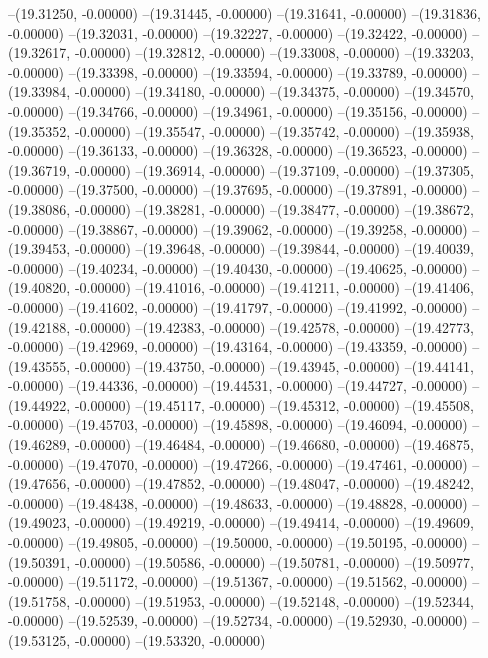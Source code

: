 --(19.31250, -0.00000)
--(19.31445, -0.00000)
--(19.31641, -0.00000)
--(19.31836, -0.00000)
--(19.32031, -0.00000)
--(19.32227, -0.00000)
--(19.32422, -0.00000)
--(19.32617, -0.00000)
--(19.32812, -0.00000)
--(19.33008, -0.00000)
--(19.33203, -0.00000)
--(19.33398, -0.00000)
--(19.33594, -0.00000)
--(19.33789, -0.00000)
--(19.33984, -0.00000)
--(19.34180, -0.00000)
--(19.34375, -0.00000)
--(19.34570, -0.00000)
--(19.34766, -0.00000)
--(19.34961, -0.00000)
--(19.35156, -0.00000)
--(19.35352, -0.00000)
--(19.35547, -0.00000)
--(19.35742, -0.00000)
--(19.35938, -0.00000)
--(19.36133, -0.00000)
--(19.36328, -0.00000)
--(19.36523, -0.00000)
--(19.36719, -0.00000)
--(19.36914, -0.00000)
--(19.37109, -0.00000)
--(19.37305, -0.00000)
--(19.37500, -0.00000)
--(19.37695, -0.00000)
--(19.37891, -0.00000)
--(19.38086, -0.00000)
--(19.38281, -0.00000)
--(19.38477, -0.00000)
--(19.38672, -0.00000)
--(19.38867, -0.00000)
--(19.39062, -0.00000)
--(19.39258, -0.00000)
--(19.39453, -0.00000)
--(19.39648, -0.00000)
--(19.39844, -0.00000)
--(19.40039, -0.00000)
--(19.40234, -0.00000)
--(19.40430, -0.00000)
--(19.40625, -0.00000)
--(19.40820, -0.00000)
--(19.41016, -0.00000)
--(19.41211, -0.00000)
--(19.41406, -0.00000)
--(19.41602, -0.00000)
--(19.41797, -0.00000)
--(19.41992, -0.00000)
--(19.42188, -0.00000)
--(19.42383, -0.00000)
--(19.42578, -0.00000)
--(19.42773, -0.00000)
--(19.42969, -0.00000)
--(19.43164, -0.00000)
--(19.43359, -0.00000)
--(19.43555, -0.00000)
--(19.43750, -0.00000)
--(19.43945, -0.00000)
--(19.44141, -0.00000)
--(19.44336, -0.00000)
--(19.44531, -0.00000)
--(19.44727, -0.00000)
--(19.44922, -0.00000)
--(19.45117, -0.00000)
--(19.45312, -0.00000)
--(19.45508, -0.00000)
--(19.45703, -0.00000)
--(19.45898, -0.00000)
--(19.46094, -0.00000)
--(19.46289, -0.00000)
--(19.46484, -0.00000)
--(19.46680, -0.00000)
--(19.46875, -0.00000)
--(19.47070, -0.00000)
--(19.47266, -0.00000)
--(19.47461, -0.00000)
--(19.47656, -0.00000)
--(19.47852, -0.00000)
--(19.48047, -0.00000)
--(19.48242, -0.00000)
--(19.48438, -0.00000)
--(19.48633, -0.00000)
--(19.48828, -0.00000)
--(19.49023, -0.00000)
--(19.49219, -0.00000)
--(19.49414, -0.00000)
--(19.49609, -0.00000)
--(19.49805, -0.00000)
--(19.50000, -0.00000)
--(19.50195, -0.00000)
--(19.50391, -0.00000)
--(19.50586, -0.00000)
--(19.50781, -0.00000)
--(19.50977, -0.00000)
--(19.51172, -0.00000)
--(19.51367, -0.00000)
--(19.51562, -0.00000)
--(19.51758, -0.00000)
--(19.51953, -0.00000)
--(19.52148, -0.00000)
--(19.52344, -0.00000)
--(19.52539, -0.00000)
--(19.52734, -0.00000)
--(19.52930, -0.00000)
--(19.53125, -0.00000)
--(19.53320, -0.00000)
